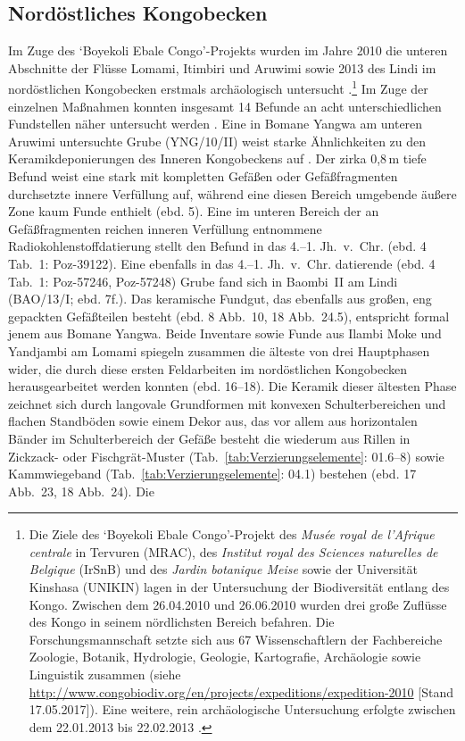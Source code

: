 \subsection{Nordöstliches Kongobecken}\label{sec:NordCongo}

Im Zuge des \enquote*{Boyekoli Ebale Congo}-Projekts wurden im Jahre 2010 die unteren Abschnitte der Flüsse Lomami, Itimbiri und Aruwimi sowie 2013 des Lindi im nordöstlichen Kongobecken erstmals archäologisch untersucht \parencite[2]{LivingstoneSmith.2017}.\footnote{Die Ziele des \enquote*{Boyekoli Ebale Congo}-Projekt des \textit{Musée royal de l'Afrique centrale} in Tervuren (MRAC), des \textit{Institut royal des Sciences naturelles de Belgique} (IrSnB) und des \textit{Jardin botanique Meise} sowie der Universität Kinshasa (UNIKIN) lagen in der Untersuchung der Biodiversität entlang des Kongo. Zwischen dem 26.04.2010 und 26.06.2010 wurden drei große Zuflüsse des Kongo in seinem nördlichsten Bereich befahren. Die Forschungsmannschaft setzte sich aus 67 Wissenschaftlern der Fachbereiche Zoologie, Botanik, Hydrologie, Geologie, Kartografie, Archäologie sowie Linguistik zusammen (siehe \url{http://www.congobiodiv.org/en/projects/expeditions/expedition-2010} [Stand 17.05.2017]). Eine weitere, rein archäologische Untersuchung erfolgte zwischen dem 22.01.2013 bis 22.02.2013 \parencites[siehe][]{LivingstoneSmith.2011}{Cornelissen.2013}.\label{ftn:BoyekoliEbaleCongo}} Im Zuge der einzelnen Maßnahmen konnten insgesamt 14 Befunde an acht unterschiedlichen Fundstellen näher untersucht werden \parencite[4 Tab.~1]{LivingstoneSmith.2017}. Eine in Bomane Yangwa am unteren Aruwimi untersuchte Grube (YNG/10/II) weist starke Ähnlichkeiten zu den Keramikdeponierungen des Inneren Kongobeckens auf \parencites[13 Abb.~2]{LivingstoneSmith.2011}[siehe][]{Wotzka.1993}. Der zirka 0,8\,m tiefe Befund weist eine stark mit kompletten Gefäßen oder Gefäßfragmenten \parencites[siehe][14 Abb.~3]{LivingstoneSmith.2011}[18 Abb.~24.4]{LivingstoneSmith.2017} durchsetzte innere Verfüllung auf, während eine diesen Bereich umgebende äußere Zone kaum Funde enthielt (ebd. 5). Eine im unteren Bereich der an Gefäßfragmenten reichen inneren Verfüllung entnommene Radiokohlenstoffdatierung stellt den Befund in das 4.--1. Jh.~v.~Chr. (ebd. 4 Tab.~1: Poz-39122). Eine ebenfalls in das 4.--1. Jh.~v.~Chr. datierende (ebd. 4 Tab.~1: Poz-57246, Poz-57248) Grube fand sich in Baombi~II am Lindi (BAO/13/I; ebd. 7f.). Das keramische Fundgut, das ebenfalls aus großen, eng gepackten Gefäßteilen besteht (ebd. 8 Abb.~10, 18 Abb.~24.5), entspricht formal jenem aus Bomane Yangwa. Beide Inventare sowie Funde aus Ilambi Moke und Yandjambi am Lomami spiegeln zusammen die älteste von drei Hauptphasen wider, die durch diese ersten Feldarbeiten im nordöstlichen Kongobecken herausgearbeitet werden konnten (ebd. 16--18). Die Keramik dieser ältesten Phase zeichnet sich durch langovale Grundformen mit konvexen Schulterbereichen und flachen Standböden sowie einem Dekor aus, das vor allem aus horizontalen Bänder im Schulterbereich der Gefäße besteht die wiederum aus Rillen in Zickzack- oder Fischgrät-Muster (Tab.~\ref{tab:Verzierungselemente}: 01.6--8) sowie Kammwiegeband (Tab.~\ref{tab:Verzierungselemente}: 04.1) bestehen (ebd. 17 Abb.~23, 18 Abb.~24). Die 